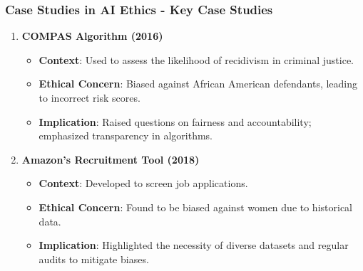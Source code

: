 \documentclass[aspectratio=169]{beamer}
\begin{document}
\begin{frame}[fragile]
    \frametitle{Case Studies in AI Ethics - Key Case Studies}
    \begin{enumerate}
        \item \textbf{COMPAS Algorithm (2016)}
          \begin{itemize}
              \item \textbf{Context}: Used to assess the likelihood of recidivism in criminal justice.
              \item \textbf{Ethical Concern}: Biased against African American defendants, leading to incorrect risk scores.
              \item \textbf{Implication}: Raised questions on fairness and accountability; emphasized transparency in algorithms.
          \end{itemize}
          
        \item \textbf{Amazon's Recruitment Tool (2018)}
          \begin{itemize}
              \item \textbf{Context}: Developed to screen job applications.
              \item \textbf{Ethical Concern}: Found to be biased against women due to historical data.
              \item \textbf{Implication}: Highlighted the necessity of diverse datasets and regular audits to mitigate biases.
          \end{itemize}
    \end{enumerate}
\end{frame}
\end{document}
